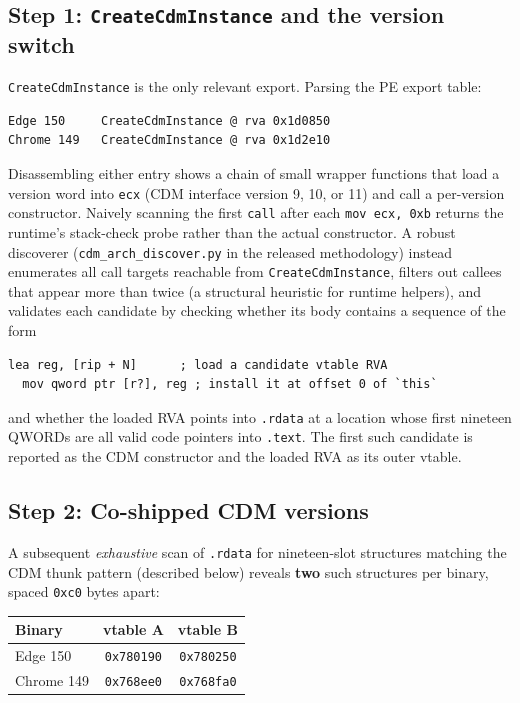 \documentclass[11pt,letterpaper]{article}
\begin{document}
\subsection{Step 1: \texttt{CreateCdmInstance} and the version
            switch}
\label{sec:static-export}

\texttt{CreateCdmInstance} is the only relevant export.  Parsing the
PE export table:

\begin{lstlisting}[basicstyle=\ttfamily\scriptsize]
Edge 150     CreateCdmInstance @ rva 0x1d0850
Chrome 149   CreateCdmInstance @ rva 0x1d2e10
\end{lstlisting}

Disassembling either entry shows a chain of small wrapper functions
that load a version word into \texttt{ecx} (CDM interface version
9, 10, or 11) and call a per-version constructor.  Naively scanning
the first \texttt{call} after each \texttt{mov ecx, 0xb} returns the
runtime's stack-check probe rather than the actual constructor.  A
robust discoverer (\texttt{cdm\_arch\_discover.py} in the released
methodology) instead enumerates all call targets reachable from
\texttt{CreateCdmInstance}, filters out callees that appear more than
twice (a structural heuristic for runtime helpers), and validates
each candidate by checking whether its body contains a sequence of
the form
\begin{lstlisting}[basicstyle=\ttfamily\scriptsize]
  lea reg, [rip + N]      ; load a candidate vtable RVA
  mov qword ptr [r?], reg ; install it at offset 0 of `this`
\end{lstlisting}

\noindent and whether the loaded RVA points into \texttt{.rdata} at a
location whose first nineteen QWORDs are all valid code pointers into
\texttt{.text}.  The first such candidate is reported as the CDM
constructor and the loaded RVA as its outer vtable.

\subsection{Step 2: Co-shipped CDM versions}
\label{sec:static-versions}

A subsequent \emph{exhaustive} scan of \texttt{.rdata} for
nineteen-slot structures matching the CDM thunk pattern (described
below) reveals \textbf{two} such structures per binary, spaced
\texttt{0xc0} bytes apart:

\begin{center}\small
\begin{tabular}{lcc}
\toprule
\textbf{Binary} & \textbf{vtable A} & \textbf{vtable B} \\
\midrule
Edge 150    & \texttt{0x780190} & \texttt{0x780250} \\
Chrome 149  & \texttt{0x768ee0} & \texttt{0x768fa0} \\
\bottomrule
\end{tabular}
\end{center}
\end{document}
